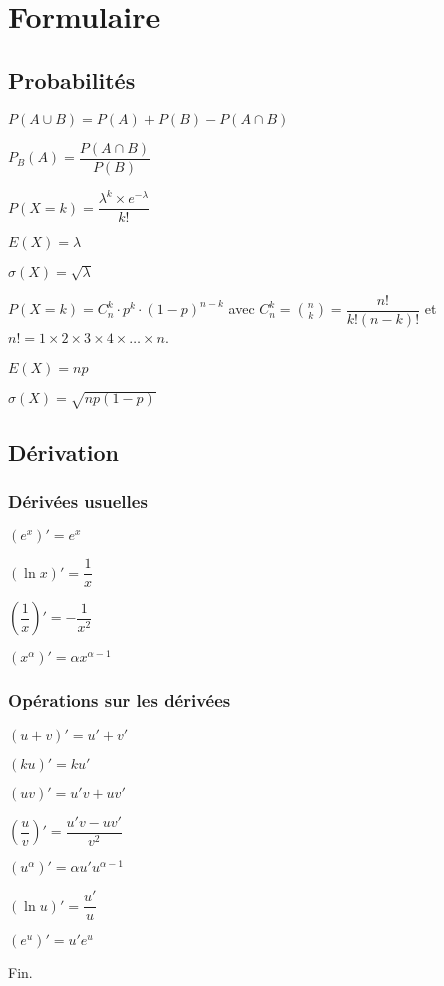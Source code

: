 \documentclass[a4paper,12pt]{scrartcl}
\begin{document}
\section*{Formulaire}

\subsection*{Probabilités}

$P(A \cup B) = P(A) + P(B) - P(A \cap B)$

$P_B(A) = \dfrac{P(A \cap B)}{P(B)}$

 $P(X=k) = \dfrac{\lambda^{k} \times e^{-\lambda}}{k!}$

$E(X) = \lambda$

$\sigma(X) = \sqrt{\lambda}$

 $P(X=k) = C_{n}^{k} \cdot p^{k} \cdot (1-p)^{n-k}$ avec $C_{n}^{k} = \binom{n}{k} = \dfrac{n!}{k!(n-k)!}$ et $n! = 1 \times 2 \times 3 \times 4 \times \ldots \times n$.

$E(X) = np$ 

$\sigma(X) = \sqrt{np(1-p)}$

\subsection*{Dérivation}

\begin{multicols}{2}
\subsubsection*{Dérivées usuelles}

$\left(e^x\right)' = e^x$

$\left(\ln x\right)' = \dfrac{1}{x}$

$\left(\dfrac{1}{x}\right)' = -\dfrac{1}{x^2}$

$\left( x^\alpha \right)' = \alpha x^{\alpha - 1}$

\subsubsection*{Opérations sur les dérivées}

$\left(u+v\right)' = u'+v'$

$\left(ku\right)' = ku'$

$\left(uv\right)' = u'v + uv'$

$\left(\dfrac{u}{v}\right)' = \dfrac{u'v-uv'}{v^{2}}$

$\left(u^{\alpha}\right)' = \alpha u' u^{\alpha-1}$

$(\ln u)' = \dfrac{u'}{u}$

$\left(e^{u}\right)' = u' e^{u}$
\end{multicols}

\trait

\begin{center}
Fin.
\end{center}
\end{document}
